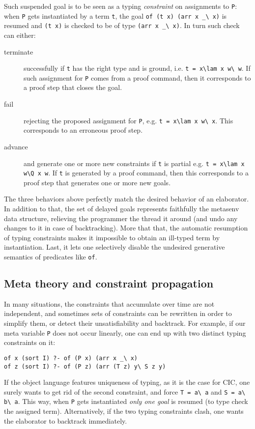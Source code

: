 \documentclass{easychair}
\begin{document}
Such suspended goal is to be seen as a typing \emph{constraint} on
assignments to \verb+P+: when \verb+P+ gets instantiated by a
term \verb+t+, the goal \verb+of (t x) (arr x _\ x)+ is resumed
and \verb+(t x)+ is checked to be of type \verb+(arr x _\ x)+.
In turn such check can either:
\begin{description}
\item[terminate] successfully if \verb+t+ has the right type and is ground,
	i.e. \verb+t = x\lam x w\ w+.  If such assignment for \verb+P+
	comes from a proof command, then it corresponds to a proof
	step that closes the goal.
\item[fail] rejecting the proposed assignment for \verb+P+, e.g. 
	\verb+t = x\lam x w\ x+.  This corresponds to an erroneous proof
	step.
\item[advance] and generate one or more new constraints if \verb+t+ is partial
	e.g. \verb+t = x\lam x w\Q x w+.  If \verb+t+ is generated by
	a proof command, then this corresponds to a proof step that
	generates one or more new goals.
\end{description}
The three behaviors above perfectly match the desired behavior of an
elaborator.  In addition to that, the set of delayed goals
represents faithfully the metasenv data structure, relieving the
programmer the thread it around (and undo any changes to it in case of
backtracking).  More that that, the automatic resumption of typing
constraints makes it impossible to obtain an ill-typed term by
instantiation.  Last, it lets one selectively disable the undesired
generative semantics of predicates like \verb+of+.

\subsection{Meta theory and constraint propagation} %

In many situations, the constraints that accumulate over time are not
independent, and sometimes sets of constraints can be rewritten in
order to simplify them, or detect their unsatisfiability and
backtrack.
For example, if our meta variable \verb+P+ does not occur linearly, one 
can end up with two distinct typing constraints on it:

\begin{verbatim}
of x (sort I) ?- of (P x) (arr x _\ x)
of z (sort I) ?- of (P z) (arr (T z) y\ S z y)
\end{verbatim}

If the object language features uniqueness of typing, as it is the case
for CIC, one surely wants to get rid of the second constraint, and
force \verb+T = a\ a+ and \verb+S = a\ b\ a+.
This way, when \verb+P+ gets instantiated \emph{only one goal}
is resumed (to type check the assigned term).  Alternatively,
if the two typing constraints clash, one wants the elaborator to
backtrack immediately.
\end{document}
